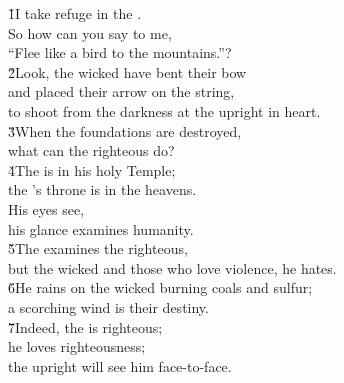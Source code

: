 \begin{poetry}
\poeml \v{1}I take refuge in the . \\
\poemll    So how can you say to me, \\
\poemlll       ``Flee like a bird to the mountains.''? \\
\poeml \v{2}Look, the wicked have bent their bow \\
\poemll    and placed their arrow on the string, \\
\poemlll       to shoot from the darkness at the upright in heart. \\
\poeml \v{3}When the foundations are destroyed, \\
\poemll    what can the righteous do? \\
\poeml \v{4}The  is in his holy Temple; \\
\poemll    the 's throne is in the heavens. \\
\poeml His eyes see, \\
\poemll    his glance examines humanity. \\
\poeml \v{5}The  examines the righteous, \\
\poemll    but the wicked and those who love violence, he hates. \\
\poeml \v{6}He rains on the wicked burning coals and sulfur; \\
\poemll    a scorching wind is their destiny. \\
\poeml \v{7}Indeed, the  is righteous; \\
\poemll    he loves righteousness; \\
\poemlll       the upright will see him face-to-face.
\end{poetry}

